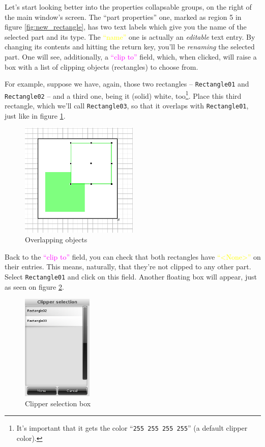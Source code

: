 \documentclass[a4paper]{profusion}
\newcommand{\GUILabel}[1]{\textcolor{magenta}{#1}}
\newcommand{\GUIEditable}[1]{\textcolor{yellow}{#1}} %
\begin{document}
Let's start looking better into the properties collapsable groups, on
the right of the main window's screen. The ``part properties'' one,
marked as region 5 in figure \ref{fig:new_rectangle}, has two text
labels which give you the name of the selected part and its type. The
\GUIEditable{``name''} one is actually an \emph{editable} text
entry. By changing its contents and hitting the return key, you'll be
\emph{renaming} the selected part. One will see, additionally, a
\GUILabel{``clip to''} field, which, when clicked, will raise a box
with a list of clipping objects (rectangles) to choose from.

For example, suppose we have, again, those two rectangles --
\texttt{Rectangle01} and \texttt{Rectangle02} -- and a third one,
being it (solid) white, too\footnote{ It's important that it gets the
  color ``\texttt{255 255 255 255}'' (a default clipper
  color).}. Place this third rectangle, which we'll call
\texttt{Rectangle03}, so that it overlaps with \texttt{Rectangle01},
just like in figure \ref{fig:overlap_white}.

\begin{figure}[h!]
  \centering
  \includegraphics[width=0.5\textwidth]{images/rectangle_overlap_white.png}
  \caption{Overlapping objects}
  \label{fig:overlap_white}
\end{figure}

Back to the \GUILabel{``clip to''} field, you can check that both
rectangles have \GUIEditable{``<None>''} on their entries. This means,
naturally, that they're not clipped to any other part. Select
\texttt{Rectangle01} and click on this field. Another floating box
will appear, just as seen on figure \ref{fig:clipping_box}.

\begin{figure}[h!]
  \centering
  \includegraphics[width=0.3\textwidth]{images/clipping_box.png}
  \caption{Clipper selection box}
  \label{fig:clipping_box}
\end{figure}
\end{document}
